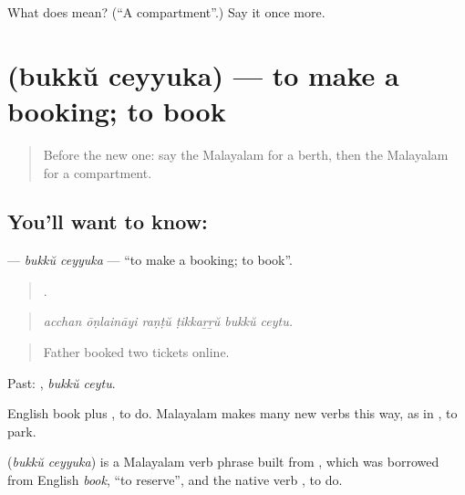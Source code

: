 \begin{tcolorbox}[breakable,colback=teal!4,colframe=teal!35!black,title={Before you move on}]
What does  mean? (\textquotedblleft{}A compartment\textquotedblright{}.) Say it once more.
\end{tcolorbox}
\section[\texorpdfstring{\ml{ബുക്ക്} \ml{ചെയ്യുക} (bukkŭ ceyyuka)}{ബുക്ക് ചെയ്യുക (bukkŭ ceyyuka)}]{  (bukkŭ ceyyuka) — to make a booking; to book}

\label{lesson:ML-C462-bukku-ceyyuka}



\begin{quote}
Before the new one: say the Malayalam for a berth, then the Malayalam for a compartment.
\end{quote}

\subsection*{You'll want to know:  }
\textbf{ } — \emph{bukkŭ ceyyuka} — \textquotedblleft{}to make a booking; to book\textquotedblright{}.

\begin{quote}
     .
\end{quote}

\begin{quote}
\emph{acchan ōṇlaināyi raṇṭŭ ṭikkaṟṟŭ bukkŭ ceytu.}
\end{quote}

\begin{quote}
Father booked two tickets online.
\end{quote}

Past:  , \emph{bukkŭ ceytu}.

English book plus , to do. Malayalam makes many new verbs this way, as in  , to park.

\begin{cousinweb}
\textbf{ } (\emph{bukkŭ ceyyuka}) is a Malayalam verb phrase built from , which was borrowed from English \emph{book}, \textquotedblleft{}to reserve\textquotedblright{}, and the native verb , to do.
\end{cousinweb}

